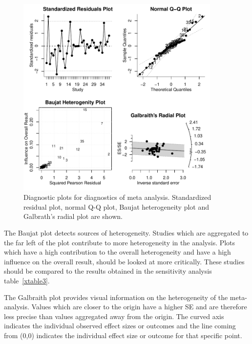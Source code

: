 \documentclass[11pt, a4paper]{article}
\begin{document}
\begin{figure} [h!]
\captionsetup{width=0.6\textwidth}
\centering
\includegraphics[width=0.9\textwidth]{sweave_document_TB-diagnostics}
\caption{Diagnostic plots for diagnostics of meta analysis. Standardized residual plot, normal Q-Q plot, Baujat heterogeneity plot and Galbrath's radial plot are shown.}
\label{fig:diagnostics}
\end{figure}

The Baujat plot detects sources of heterogeneity. Studies which are aggregated to the far left of the plot contribute to more heterogeneity in the analysis. Plots which have a high contribution to the overall heterogeneity and have a high influence on the overall result, should be looked at more critically. These studies should be compared to the results obtained in the sensitivity analysis table~\ref{xtable3}.  


The Galbraith plot provides visual information on the heterogeneity of the meta-analysis. Values which are closer to the origin have a higher SE and are therefore less precise than values aggregated away from the origin. The curved axis indicates the individual observed effect sizes or outcomes and the line coming from (0,0) indicates the individual effect size or outcome for that specific point. 

\bigskip
\bigskip

\end{document}
